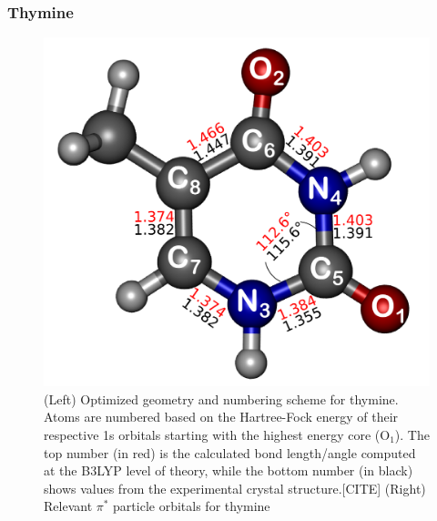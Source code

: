 \documentclass[12pt]{article}
\begin{document}
\subsubsection{Thymine}
  \begin{figure}[ht!]
  \centering
  \includegraphics[scale=0.60]{g130.png}
  \caption{(Left) Optimized geometry and numbering scheme for thymine. Atoms are numbered based on the Hartree-Fock energy of their respective 1s orbitals starting with the highest energy core (O$_1$). The top number (in red) is the calculated bond length/angle computed at the B3LYP level of theory, while the bottom number (in black) shows values from the experimental crystal structure.[CITE] (Right) Relevant $\pi^*$ particle orbitals for thymine}
  \end{figure}
\end{document}
